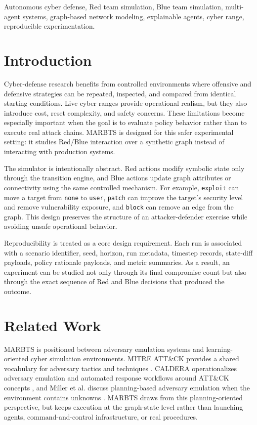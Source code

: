 \documentclass[conference]{IEEEtran}
\begin{document}
\begin{IEEEkeywords}
Autonomous cyber defense, Red team simulation, Blue team simulation, multi-agent systems, graph-based network modeling, explainable agents, cyber range, reproducible experimentation.
\end{IEEEkeywords}

\section{Introduction}
Cyber-defense research benefits from controlled environments where offensive and defensive strategies can be repeated, inspected, and compared from identical starting conditions. Live cyber ranges provide operational realism, but they also introduce cost, reset complexity, and safety concerns. These limitations become especially important when the goal is to evaluate policy behavior rather than to execute real attack chains. MARBTS is designed for this safer experimental setting: it studies Red/Blue interaction over a synthetic graph instead of interacting with production systems.

The simulator is intentionally abstract. Red actions modify symbolic state only through the transition engine, and Blue actions update graph attributes or connectivity using the same controlled mechanism. For example, \texttt{exploit} can move a target from \texttt{none} to \texttt{user}, \texttt{patch} can improve the target's security level and remove vulnerability exposure, and \texttt{block} can remove an edge from the graph. This design preserves the structure of an attacker-defender exercise while avoiding unsafe operational behavior.

Reproducibility is treated as a core design requirement. Each run is associated with a scenario identifier, seed, horizon, run metadata, timestep records, state-diff payloads, policy rationale payloads, and metric summaries. As a result, an experiment can be studied not only through its final compromise count but also through the exact sequence of Red and Blue decisions that produced the outcome.

\section{Related Work}
MARBTS is positioned between adversary emulation systems and learning-oriented cyber simulation environments. MITRE ATT\&CK provides a shared vocabulary for adversary tactics and techniques \cite{attack}. CALDERA operationalizes adversary emulation and automated response workflows around ATT\&CK concepts \cite{caldera}, and Miller et al. discuss planning-based adversary emulation when the environment contains unknowns \cite{miller}. MARBTS draws from this planning-oriented perspective, but keeps execution at the graph-state level rather than launching agents, command-and-control infrastructure, or real procedures.
\end{document}
